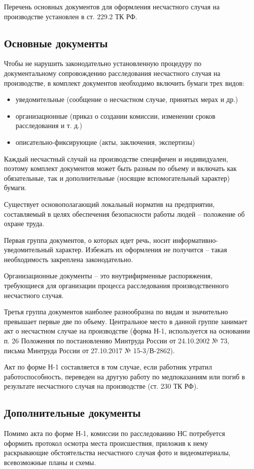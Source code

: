 Перечень основных документов для оформления несчастного случая на производстве установлен в ст. 229.2 ТК РФ.

\subsection{Основные документы}
Чтобы не нарушить законодательно установленную процедуру по документальному сопровождению расследования несчастного случая на производстве, в комплект документов необходимо включить бумаги трех видов:
\begin{itemize}
    \item уведомительные (сообщение о несчастном случае, принятых мерах и др.)
    \item организационные (приказ о создании комиссии, изменении сроков расследования и т. д.)
    \item описательно-фиксирующие (акты, заключения, экспертизы)
\end{itemize}


Каждый несчастный случай на производстве специфичен и индивидуален, поэтому комплект документов может быть разным по объему и включать как обязательные, так и дополнительные (носящие вспомогательный характер) бумаги.

Существует основополагающий локальный норматив на предприятии, составляемый в целях обеспечения безопасности работы людей -- положение об охране труда.

Первая группа документов, о которых идет речь, носит информативно-уведомительный характер. Избежать их оформления не получится -- такая необходимость закреплена законодательно.

Организационные документы -- это внутрифирменные распоряжения, требующиеся для организации процесса расследования производственного несчастного случая.

Третья группа документов наиболее разнообразна по видам и значительно превышает первые две по объему. Центральное место в данной группе занимает акт о несчастном случае на производстве (форма Н-1, используется на основании п. 26 Положения по постановлению Минтруда России от 24.10.2002 № 73, письма Минтруда России от 27.10.2017 № 15-3/В-2862).


Акт по форме Н-1 составляется в том случае, если работник утратил работоспособность, переведен на другую работу по медпоказаниям или погиб в результате несчастного случая на производстве (ст. 230 ТК РФ).

\subsection{Дополнительные документы}
Помимо акта по форме Н-1, комиссии по расследованию НС потребуется оформить протокол осмотра места происшествия, приложив к нему раскрывающие обстоятельства несчастного случая фото и видеоматериалы, всевозможные планы и схемы.


